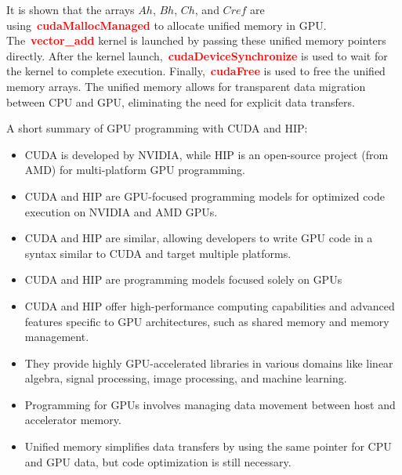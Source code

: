 








\par
It is shown that the arrays $Ah$, $Bh$, $Ch$, and $Cref$ are using~\textbf{\textcolor{red}{cudaMallocManaged}} to allocate unified memory in GPU.
The~\textbf{\textcolor{red}{vector\_add}} kernel is launched by passing these unified memory pointers directly.
After the kernel launch,~\textbf{\textcolor{red}{cudaDeviceSynchronize}} is used to wait for the kernel to complete execution.
Finally,~\textbf{\textcolor{red}{cudaFree}} is used to free the unified memory arrays.
The unified memory allows for transparent data migration between CPU and GPU, eliminating the need for explicit data transfers.


\par
A short summary of GPU programming with CUDA and HIP:
\begin{itemize}
    \item CUDA is developed by NVIDIA, while HIP is an open-source project (from AMD) for multi-platform GPU programming.
    \item CUDA and HIP are GPU-focused programming models for optimized code execution on NVIDIA and AMD GPUs.
    \item CUDA and HIP are similar, allowing developers to write GPU code in a syntax similar to CUDA and target multiple platforms.
    \item CUDA and HIP are programming models focused solely on GPUs
    \item CUDA and HIP offer high-performance computing capabilities and advanced features specific to GPU architectures, such as shared memory and memory management.
    \item They provide highly GPU-accelerated libraries in various domains like linear algebra, signal processing, image processing, and machine learning.
    \item Programming for GPUs involves managing data movement between host and accelerator memory.
    \item Unified memory simplifies data transfers by using the same pointer for CPU and GPU data, but code optimization is still necessary.
\end{itemize}


